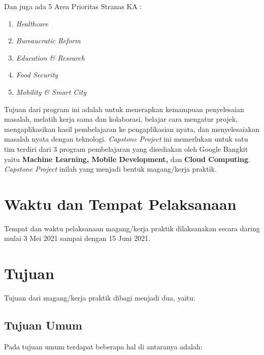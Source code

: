 Dan juga ada 5 Area Prioritas Stranas KA \cite{stranas}:

\begin{enumerate}[nolistsep]

  \item \textit{Healthcare}

  \item \textit{Bureaucratic Reform}

  \item \textit{Education \& Research}

  \item \textit{Food Security}

  \item \textit{Mobility \& Smart City}

\end{enumerate}
Tujuan dari program ini adalah untuk menerapkan kemampuan penyelesaian masalah, melatih kerja sama dan kolaborasi, belajar cara mengatur projek, mengaplikasikan hasil pembelajaran ke pengaplikasian nyata, dan menyelesaiakan masalah nyata dengan teknologi.
\textit{Capstone Project} ini memerlukan untuk satu tim terdiri dari 3 program pembelajaran yang disediakan oleh Google Bangkit yaitu \textbf{Machine Learning, Mobile Development,} dan \textbf{Cloud Computing}.
\textit{Capstone Project} inilah yang menjadi bentuk magang/kerja praktik.

\section{Waktu dan Tempat Pelaksanaan}

Tempat dan waktu pelaksanaan magang/kerja praktik dilaksanakan secara daring mulai 3 Mei 2021 sampai dengan 15 Juni 2021.

\section{Tujuan}

Tujuan dari magang/kerja praktik dibagi menjadi dua, yaitu:

  \subsection{Tujuan Umum}
  Pada tujuan umum terdapat beberapa hal di antaranya adalah:
  
